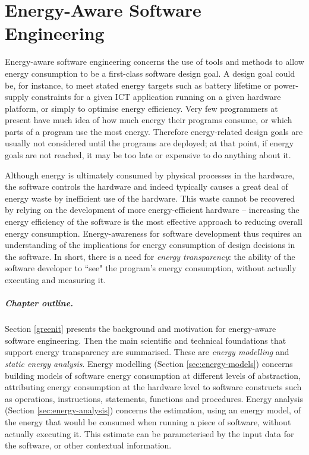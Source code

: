 \documentclass[oneside]{book}
\begin{document}
\chapter{Energy-Aware Software Engineering}

Energy-aware software engineering concerns the use of tools and methods to allow energy consumption to be a first-class software design goal. A design goal could be, for instance, to meet stated energy targets such as battery lifetime or power-supply constraints for a given ICT application running on a given hardware platform, or simply to optimise energy efficiency. Very few programmers at present have much idea of how much energy their programs consume, or which parts of a program use the most energy. Therefore energy-related design goals are usually not considered until the programs are deployed; at that point, if energy goals are not reached, it may be too late or expensive to do anything about it.


Although energy is ultimately consumed by physical processes in the hardware, the software controls the hardware and indeed typically causes a great deal of energy waste by inefficient use of the hardware. This waste cannot be recovered by relying on the development of more energy-efficient hardware -- increasing the energy efficiency of the software is the most effective approach to reducing overall energy consumption. Energy-awareness for software development thus requires an understanding of the implications for energy consumption of design decisions in the software. In short, there is a need for \emph{energy transparency}: the ability of the software developer to ``see" the program's energy consumption, without actually executing and measuring it.

\paragraph{Chapter outline.}  Section \ref{greenit} presents the background and motivation for energy-aware software engineering. Then  the main scientific and technical foundations that support energy transparency are summarised.  These are \emph{energy modelling} and \emph{static energy analysis}. Energy modelling (Section \ref{sec:energy-models}) concerns building models of software energy consumption at different levels of abstraction, attributing energy consumption at the hardware level to software constructs such as operations, instructions, statements, functions and
procedures.   Energy analysis (Section \ref{sec:energy-analysis}) concerns the estimation, using an energy model, of the energy that would be consumed when running a piece of software, without actually executing it.  This estimate can be parameterised by the input data for the software, or other contextual information. 
\end{document}
